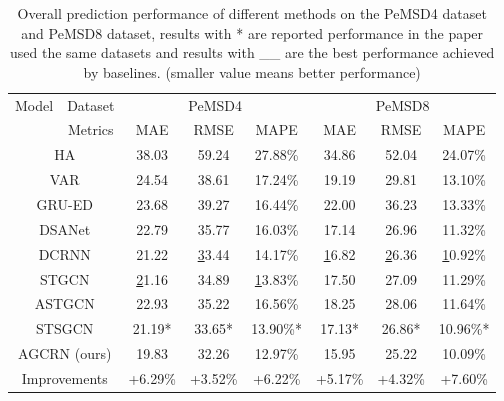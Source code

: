 \documentclass{article}
\begin{document}
\begin{table}[]
\centering
\caption{Overall prediction performance of different methods on the PeMSD4 dataset and PeMSD8 dataset, results with * are reported performance in the paper used the same datasets and results with \_\_ are the best performance achieved by baselines. (smaller value means better performance)}
\label{overall-comparison}
\begin{tabular}{@{}cccccccc@{}}
\toprule
\multirow{2}{*}{Model} & Dataset & \multicolumn{3}{c}{PeMSD4}                & \multicolumn{3}{c}{PeMSD8}               \\ \cmidrule(l){2-8} 
                       & Metrics & MAE         & RMSE        & MAPE          & MAE         & RMSE        & MAPE          \\ \midrule
\multicolumn{2}{c}{HA}           & 38.03       & 59.24       & 27.88\%       & 34.86       & 52.04       & 24.07\%       \\ \midrule
\multicolumn{2}{c}{VAR}          & 24.54       & 38.61       & 17.24\%       & 19.19       & 29.81       & 13.10\%       \\ \midrule
\multicolumn{2}{c}{GRU-ED}          & 23.68       & 39.27       & 16.44\%       & 22.00       & 36.23       & 13.33\%       \\ \midrule
\multicolumn{2}{c}{DSANet \cite{dsanet}}       & 22.79       & 35.77       & 16.03\%       & 17.14       & 26.96       & 11.32\%       \\ \midrule
\multicolumn{2}{c}{DCRNN \cite{DCRNN}}        & 21.22       & {\ul 33.44} & 14.17\%       & {\ul 16.82} & {\ul 26.36} & {\ul 10.92\%} \\ \midrule
\multicolumn{2}{c}{STGCN \cite{stgcn}}        & {\ul 21.16} & 34.89       & {\ul 13.83\%} & 17.50       & 27.09       & 11.29\%       \\ \midrule
\multicolumn{2}{c}{ASTGCN \cite{astgcn}}       & 22.93       & 35.22       & 16.56\%       & 18.25       & 28.06       & 11.64\%       \\ \midrule
\multicolumn{2}{c}{STSGCN \cite{stsgcn-aaai2020}}       & 21.19*       & 33.65*       & 13.90\%*       & 17.13*       & 26.86*       & 10.96\%*       \\ \midrule
\multicolumn{2}{c}{AGCRN (ours)}        & 19.83       & 32.26       & 12.97\%       & 15.95       & 25.22       & 10.09\%       \\ \midrule
\multicolumn{2}{c}{Improvements} & +6.29\%     & +3.52\%     & +6.22\%       & +5.17\%     & +4.32\%     & +7.60\%       \\ \bottomrule
\end{tabular}
\end{table}
\end{document}
